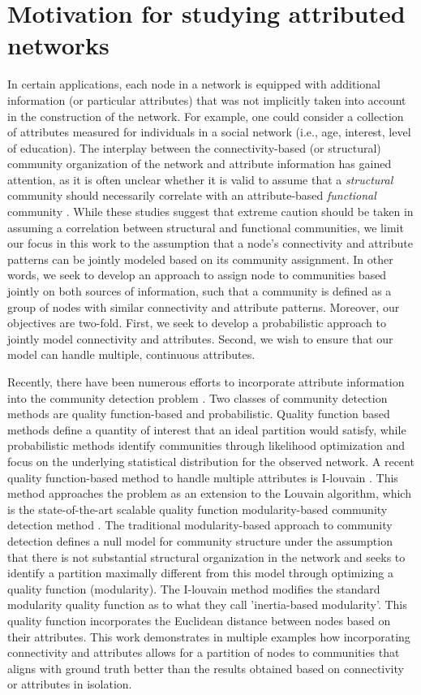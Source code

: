 \section{Motivation for studying attributed networks}
\indent In certain applications, each node in a network is equipped with additional information (or particular attributes) that was not implicitly taken into account in the construction of the network. For example, one could consider a collection of attributes measured for individuals in a social network (i.e., age, interest, level of education). The interplay between the connectivity-based (or structural) community organization of the network and attribute information has gained attention, as it is often unclear whether it is valid to assume that a \emph{structural} community should necessarily correlate with an attribute-based \emph{functional} community \cite{hric,peel2017ground,jureTruth}. While these studies suggest that extreme caution should be taken in assuming a correlation between structural and functional communities, we limit our focus in this work to the assumption that a node's connectivity and attribute patterns can be jointly modeled based on its community assignment. In other words, we seek to develop an approach to assign node to communities based jointly on both sources of information, such that a community is defined as a group of nodes with similar connectivity and attribute patterns. Moreover, our objectives are two-fold.  First, we seek to develop a probabilistic approach to jointly model connectivity and attributes. Second, we wish to ensure that our model can handle multiple, continuous attributes.  

\indent Recently, there have been numerous efforts to incorporate attribute information into the community detection problem \cite{cesna,clauset,ilouvain,hric,peel2017ground}. Two classes of community detection methods are quality function-based and probabilistic. Quality function based methods define a quantity of interest that an ideal partition would satisfy, while probabilistic methods identify communities through likelihood optimization and focus on the underlying statistical distribution for the observed network. A recent quality function-based method to handle multiple attributes is I-louvain \cite{ilouvain}. This method approaches the problem as an extension to the Louvain algorithm, which is the state-of-the-art scalable quality function modularity-based community detection method \cite{blondel}. The traditional modularity-based approach to community detection defines a null model for community structure under the assumption that there is not substantial structural organization in the network and seeks to identify a partition maximally different from this model through optimizing a quality function (modularity). The I-louvain method modifies the standard modularity quality function as to what they call 'inertia-based modularity'. This quality function incorporates the Euclidean distance between nodes based on their attributes. This work demonstrates in multiple examples how incorporating connectivity and attributes allows for a partition of nodes to communities that aligns with ground truth better than the results obtained based on connectivity or attributes in isolation.

